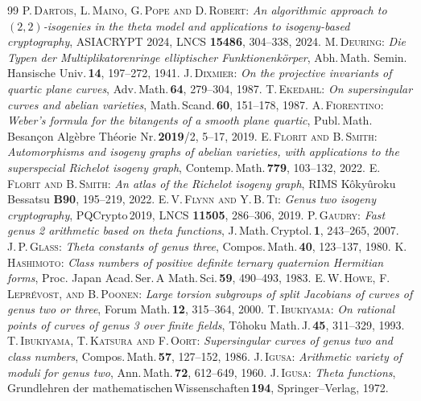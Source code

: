\documentclass{amsart}
\theoremstyle{definition}
\theoremstyle{plain}
\begin{document}
\begin{thebibliography}{99}
 \textsc{P.\,Dartois, L.\,Maino, G.\,Pope and D.\,Robert}: \textit{An algorithmic approach to $(2,2)$-isogenies in the theta model and applications to isogeny-based cryptography}, ASIACRYPT 2024, LNCS {\bf 15486}, 304--338, 2024.
 \textsc{M.\,Deuring}: \textit{Die Typen der Multiplikatorenringe elliptischer Funktionenk\"{o}rper}, Abh.\,Math. Semin.\,Hansische Univ.\,{\bf 14}, 197--272, 1941.
 \textsc{J.\,Dixmier}: \textit{On the projective invariants of quartic plane curves}, Adv.\,Math.\,{\bf 64}, 279--304, 1987.
 \textsc{T.\,Ekedahl}: \textit{On supersingular curves and abelian varieties}, Math.\,Scand.\,{\bf 60}, 151--178, 1987.
 \textsc{A.\,Fiorentino}: \textit{Weber’s formula for the bitangents of a smooth plane quartic},
Publ.\,Math. Besançon Algèbre Théorie Nr.\,{\bf 2019}/2, 5--17, 2019.
 \textsc{E.\,Florit and B.\,Smith}: \textit{Automorphisms and isogeny graphs of abelian varieties, with applications to the superspecial Richelot isogeny graph}, Contemp.\,Math.\,{\bf 779}, 103--132, 2022.
 \textsc{E.\,Florit and B.\,Smith}: \textit{An atlas of the Richelot isogeny graph}, RIMS Kôkyûroku Bessatsu {\bf B90}, 195--219, 2022.
 \textsc{E.\,V.\,Flynn and Y.\,B.\,Ti}: \textit{Genus two isogeny cryptography}, PQCrypto\,2019, LNCS {\bf 11505}, 286--306, 2019.
 \textsc{P.\,Gaudry}: \textit{Fast genus 2 arithmetic based on theta functions}, J.\,Math.\,Cryptol.\,{\bf 1}, 243--265, 2007.
 \textsc{J.\,P.\,Glass}: \textit{Theta constants of genus three}, Compos.\,Math.\,{\bf 40}, 123--137, 1980.
 \textsc{K.\,Hashimoto}: \textit{Class numbers of positive definite ternary quaternion Hermitian forms}, Proc. Japan Acad.\,Ser.\,A Math.\,Sci.\,{\bf 59}, 490--493, 1983.
 \textsc{E.\,W.\,Howe, F.\,Leprévost, and B.\,Poonen}: \textit{Large torsion subgroups of split Jacobians of curves of genus two or three}, Forum Math.\,{\bf 12}, 315--364, 2000.
 \textsc{T.\,Ibukiyama}: \textit{On rational points of curves of genus 3 over finite fields}, Tôhoku Math.\,J.\,{\bf 45}, 311--329, 1993.
 \textsc{T.\,Ibukiyama, T.\,Katsura and F.\,Oort}: \textit{Supersingular curves of genus two and class numbers}, Compos.\,Math.\,{\bf 57}, 127--152, 1986.
 \textsc{J.\,Igusa}: \textit{Arithmetic variety of moduli for genus two}, Ann.\,Math.\,{\bf 72}, 612--649, 1960.
 \textsc{J.\,Igusa}: \textit{Theta functions}, Grundlehren der mathematischen\,Wissenschaften\,{\bf 194}, Springer--Verlag, 1972.

\end{thebibliography}
\end{document}
